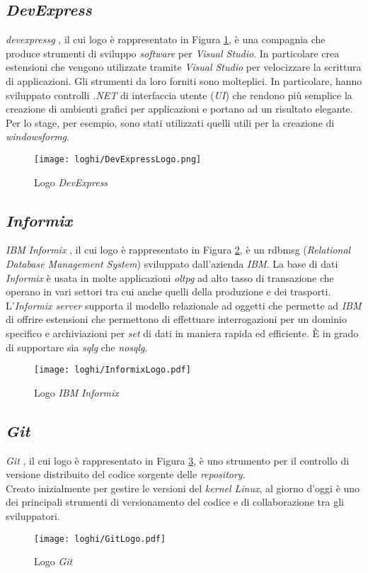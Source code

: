 \subsection*{\textit{DevExpress}}
\noindent \textit{\gls{devexpressg}} \cite{site:devexpress-docs}, il cui logo è rappresentato in Figura \ref{logoDevExpress}, è una compagnia che produce strumenti di sviluppo \textit{software} per
\textit{Visual Studio}. In particolare crea estensioni che vengono utilizzate tramite \textit{Visual Studio}
per velocizzare la scrittura di applicazioni. Gli strumenti da loro forniti sono
molteplici. In particolare, hanno sviluppato controlli \textit{.NET} di interfaccia utente (\textit{UI}) che
rendono più semplice la creazione di ambienti grafici per applicazioni e portano ad un risultato
elegante. Per lo stage, per esempio, sono stati utilizzati quelli utili per la creazione di \textit{\gls{windowsformg}}.
\begin{figure}[!h] 
    \centering 
    \texttt{[image: loghi/DevExpressLogo.png]}
    \caption{Logo \textit{DevExpress}}
    \label{logoDevExpress}
\end{figure}

\subsection*{\textit{Informix}}
\noindent \textit{IBM} \textit{Informix} \cite{site:informix-docs}, il cui logo è rappresentato in Figura \ref{logoInformix}, è un \gls{rdbmsg} (\textit{Relational Database Management System}) sviluppato dall'azienda \textit{IBM}. La base di dati \textit{Informix} è usata in molte
applicazioni \textit{\gls{oltpg}} ad alto tasso di transazione che operano in vari settori tra cui anche quelli della produzione e dei trasporti.\\
L’\textit{Informix server} supporta il modello relazionale ad oggetti che permette ad \textit{IBM} di
offrire estensioni che permettono di effettuare interrogazioni per un dominio specifico
e archiviazioni per \textit{set} di dati in maniera rapida ed efficiente.
È in grado di supportare sia \textit{\gls{sqlg}} che \textit{\gls{nosqlg}}.
\begin{figure}[!h] 
    \centering 
    \texttt{[image: loghi/InformixLogo.pdf]}
    \caption{Logo \textit{IBM} \textit{Informix}}
    \label{logoInformix}
\end{figure}

\subsection*{\textit{Git}}
\label{sec:git}
\noindent \textit{Git} \cite{site:wiki}, il cui logo è rappresentato in Figura \ref{logoGit}, è uno strumento per il controllo di versione distribuito del codice sorgente delle \textit{repository}.\\
Creato inizialmente per gestire le versioni del \textit{kernel Linux}, al giorno d'oggi è uno dei principali
strumenti di versionamento del codice e di collaborazione tra gli sviluppatori.
\begin{figure}[!h] 
    \centering 
    \texttt{[image: loghi/GitLogo.pdf]}
    \caption{Logo \textit{Git}}
    \label{logoGit}
\end{figure}